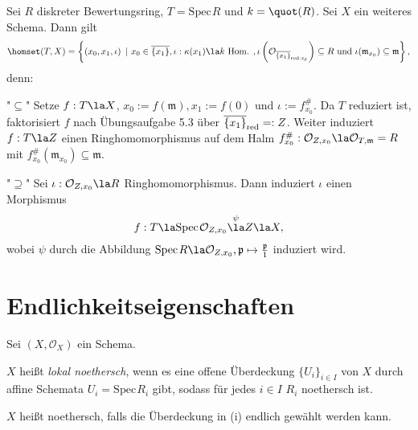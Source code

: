 \documentclass[11pt]{book}
\theoremstyle{nonumberbreak}
\newenvironment{defin}[1][]{\ifthenelse{\equal{#1}{}}{\definition}{\definition[#1]}\rm}{\enddefinition}
\newenvironment{ex}[1][]{\ifthenelse{\equal{#1}{}}{\example}{\example[#1]}\rm}{\endexample}
\newcommand{\spec}{\mathrm{Spec} \hspace{1pt} }
\newcommand{\p}{\mathfrak{p}}
\newcommand{\K}{k}
\begin{document}
\begin{spacing}{1.4}
\begin{ex}   %
Sei $R$ diskreter Bewertungsring, $T = \spec R$ und $\K = \quot(R)$. Sei $X$ ein weiteres Schema. Dann gilt 
$$\homset (T,X) = \left\{ \left(x_0, x_1, \iota\right) \ \vert \ x_0 \in \overline{\{x_1\}}, \iota: \kappa(x_1) \la \K \textrm{ Hom. }, \iota\left( \mathcal{O}_{\overline{\{x_1\}}_{\rm{red}\it, x_0}} \right) \subseteq R \textrm{ und } \iota(\mathfrak{m}_{x_0}) \subseteq \mathfrak{m} \right\},$$
denn:
\begin{compactenum}
\item["$\subseteq$"] Setze $f: T \la X$, $x_0:= f(\mathfrak{m}), x_1:= f(0)$ und $\iota:= f_{x_0}^\#$. Da $T$ reduziert ist, faktorisiert $f$ nach Übungsaufgabe 5.3 über $\overline{\{x_1\}}_{\rm{red}\it}=:Z$. Weiter induziert $f: T \la Z$ einen Ringhomomorphismus auf dem Halm $f_{x_0}^\#: \mathcal{O}_{Z,x_0} \la \mathcal{O}_{T,\mathfrak{m}} = R$ mit $f_{x_0}^\#\left(\mathfrak{m}_{x_0}\right) \subseteq \mathfrak{m}$.
\item["$\supseteq$"] Sei $\iota: \mathcal{O}_{Z,x_0} \la R$ Ringhomomorphismus. Dann induziert $\iota$ einen Morphismus $$f: T \la \spec \mathcal{O}_{Z,x_0} \overset{\psi}{\la} Z \la X,$$wobei $\psi$ durch die Abbildung $\spec R \la \mathcal{O}_{Z,x_0}, \p \mapsto \frac{\p}{1}$ induziert wird.

\end{compactenum}



\end{ex}





\newcommand{\Ocal}{\mathcal{O}}
\newcommand{\comp}{\begin{compactenum}}
\newcommand{\cend}{\end{compactenum}}



\renewcommand*\thesection{§ \arabic{section}\quad}
\section{Endlichkeitseigenschaften} %
\renewcommand*\thesection{\arabic{section}}


\begin{defin}   %
Sei $(X, \Ocal_X)$ ein Schema.
\comp
\item $X$ heißt \textit{lokal noethersch}, wenn es eine offene Überdeckung $\{U_i\}_{i \in I}$ von $X$ durch affine Schemata $U_i =\spec R_i$ gibt, sodass für jedes $i \in I$ $R_i$ noethersch ist.
\item $X$ heißt noethersch, falls die Überdeckung in (i) endlich gewählt werden kann.
\cend


\end{defin}
\end{spacing}
\end{document}
